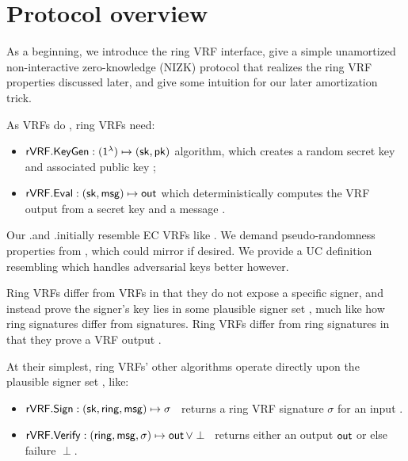 \section{Protocol overview}
\label{sec:overview}

As a beginning, we introduce the ring VRF interface, give a simple
unamortized non-interactive zero-knowledge (NIZK) protocol that
realizes the ring VRF properties discussed later,
and give some intuition for our later amortization trick.

As VRFs do \cite{vrf_micali}, ring VRFs need: 
\begin{itemize}
\item ${\mathsf{rVRF}}.{\mathsf{KeyGen}} : (1^{\lambda}) \mapsto (\mathsf{sk}, \mathsf{pk})$ algorithm,
 which creates a random secret key \sk and associated public key \pk;

\item ${\mathsf{rVRF}}.{\mathsf{Eval}} : (\mathsf{sk},\mathsf{msg}) \mapsto {\ensuremath{\mathsf{out}}}$ which deterministically computes the VRF output \Out from a secret key \sk and a message \msg.
\end{itemize}
%
Our \rVRF.\KeyGen and \rVRF.\Eval initially resemble EC VRFs like \cite{nsec5,VXEd25519,draft-irtf-cfrg-vrf-10}.
We demand pseudo-randomness properties from \Eval, which could mirror
\cite{vrf_micali} if desired.  We provide a UC definition resembling
\cite{praos,ucvrf} which handles adversarial keys better however.

Ring VRFs differ from VRFs in that they do not expose a specific signer,
and instead prove the signer's key lies in some plausible signer set \ring,
 much like how ring signatures differ from signatures.
Ring VRFs differ from ring signatures in that they prove a VRF output \Out.

At their simplest,
ring VRFs' other algorithms operate directly upon
 the plausible signer set \ring, like:
\begin{itemize}
\item ${\mathsf{rVRF}}.{\mathsf{Sign}} : (\mathsf{sk},\mathsf{ring},\mathsf{msg}) \mapsto \sigma$ \,
    returns a ring VRF signature $\sigma$ for an input \msg.
\item ${\mathsf{rVRF}}.{\mathsf{Verify}} : (\mathsf{ring},\mathsf{msg},\sigma) \mapsto {\ensuremath{\mathsf{out}}} \, \lor \perp$ \,
    returns either an output ${\mathsf{out}}$ or else failure $\perp$.
\end{itemize}

